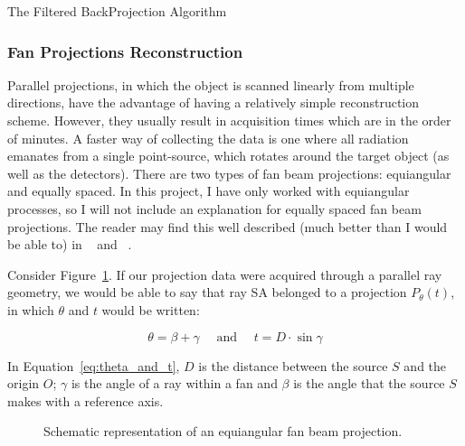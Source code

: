 \begin{algorithm}
    \caption{The Filtered BackProjection Algorithm}
    \label{alg:fbp}
    \begin{algorithmic}
    \ENDFOR
    \end{algorithmic}
\end{algorithm}

\subsubsection{Fan Projections Reconstruction}%
\label{ssub:fan_projections_reconstruction}

Parallel projections, in which the object is scanned linearly from
multiple directions, have the advantage of having a relatively simple
reconstruction scheme. However, they usually result in acquisition times
which are in the order of minutes. A faster way of collecting the data
is one where all radiation emanates from a single point-source, which
rotates around the target object (as well as the detectors). There are
two types of fan beam projections: equiangular and equally spaced. In
this project, I have only worked with equiangular processes, so I will
not include an explanation for equally spaced fan beam projections. The
reader may find this well described (much better than I would be able
to) in ~\cite{Kak2001} and ~\cite{Herman1973}.

Consider Figure~\ref{fig:equiangular}. If our projection data were
acquired through a parallel ray geometry, we would be able to say that
ray SA belonged to a projection $P_{\theta}(t)$, in which $\theta$ and
$t$ would be written:

\begin{equation}
    \label{eq:theta_and_t}
    \theta = \beta + \gamma \quad \text{ and } \quad t = D \cdot \sin \gamma
\end{equation}

In Equation~\ref{eq:theta_and_t}, $D$ is the distance between the source
$S$ and the origin $O$; $\gamma$ is the angle of a ray within a fan and
$\beta$ is the angle that the source $S$ makes with a reference axis.

\begin{figure}[htpb]
    \centering
    \caption{Schematic representation of an equiangular fan beam
    projection.}
    \label{fig:equiangular}
\end{figure}

